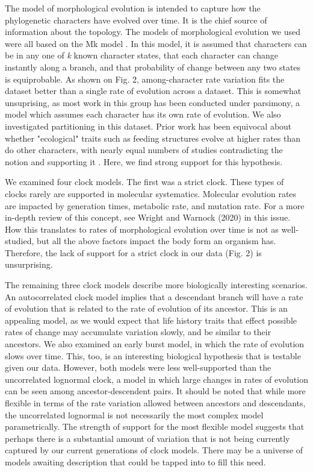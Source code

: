 \documentclass{article}
\begin{document}
The model of morphological evolution is intended to capture how the phylogenetic characters have evolved over time.
It is the chief source of information about the topology.
The models of morphological evolution we used were all based on the Mk model \citep{Lewis2001}. 
In this model, it is assumed that characters can be in any one of \textit{k} known character states, that each character can change instantly along a branch, and that probability of change between any two states is equiprobable.
As shown on Fig. 2, among-character rate variation fits the dataset better than a single rate of evolution across a dataset.
This is somewhat unsuprising, as most work in this group has been conducted under parsimony, a model which assumes each character has its own rate of evolution.
We also investigated partitioning in this dataset.
Prior work has been equivocal about whether "ecological" traits such as feeding structures evolve at higher rates than do other characters, with nearly equal numbers of studies contradicting the notion \citep{Foote1994,Sanchez-Villagra1998,Ciampaglio2002} and supporting it \citep{Wagner1995,Blomberg2003,HopkinsSmith2015}.
Here, we find strong support for this hypothesis.

We examined four clock models.
The first was a strict clock. 
These types of clocks rarely are supported in molecular systematics.
Molecular evolution rates are impacted by generation times,  metabolic rate, and mutation rate.
For a more in-depth review of this concept, see Wright and Warnock (2020) in this issue. %
How this translates to rates of morphological evolution over time is not as well-studied, but all the above factors impact the body form an organism has.
Therefore, the lack of support for a strict clock in our data (Fig. 2) is unsurprising.

The remaining three clock models describe more biologically interesting scenarios.
An autocorrelated clock model implies that a descendant branch will have a rate of evolution that is related to the rate of evolution of its ancestor.
This is an appealing model, as we would expect that life history traits that effect possible rates of change may accumulate variation slowly, and be similar to their ancestors. 
We also examined an early burst model, in which the rate of evolution slows over time.
This, too, is an interesting biological hypothesis that is testable given our data.
However, both models were less well-supported than the uncorrelated lognormal clock,
a model in which large changes in rates of evolution can be seen among ancestor-descendent pairs.
It should be noted that while more flexible in terms of the rate variation allowed between ancestors and descendants, the uncorrelated lognormal is not necessarily the most complex model parametrically. 
The strength of support for the most flexible model suggests that perhaps there is a substantial amount of variation that is not being currently captured by our current generations of clock models.
There may be a universe of models awaiting description that could be tapped into to fill this need.
\end{document}
